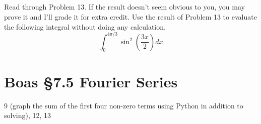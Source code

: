 \documentclass[12pt]{article}
\begin{document}
\subsection{}
Read through Problem 13. If the result doesn't seem obvious to you,
you may prove it and I'll grade it for extra credit. Use the result of
Problem 13 to evaluate the following integral without doing any calculation.
\begin{equation}
  \int_0^{4\pi/3}\sin^2\left(\frac{3x}{2}\right) dx
\end{equation}

\section{Boas \S7.5 Fourier Series}

9 (graph the sum of the first four non-zero terms using Python in
addition to solving), 12, 13
\end{document}
